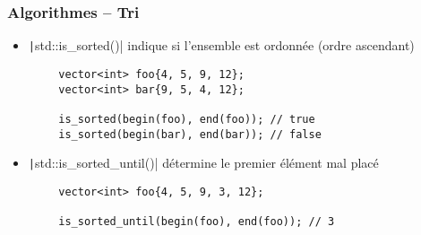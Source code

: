 \documentclass[C++.tex]{subfiles}
\begin{document}
\begin{frame}[fragile]
	\frametitle{Algorithmes -- Tri}
	\begin{itemize}
		\item \texttt|std::is_sorted()| indique si l'ensemble est ordonnée (ordre ascendant)
	\end{itemize}


	\begin{verbatim}
		vector<int> foo{4, 5, 9, 12};
		vector<int> bar{9, 5, 4, 12};

		is_sorted(begin(foo), end(foo)); // true
		is_sorted(begin(bar), end(bar)); // false
	\end{verbatim}

	\begin{itemize}
		\item \texttt|std::is_sorted_until()| détermine le premier élément mal placé
	\end{itemize}

	\begin{verbatim}
		vector<int> foo{4, 5, 9, 3, 12};

		is_sorted_until(begin(foo), end(foo)); // 3
	\end{verbatim}

\end{frame}
\end{document}
